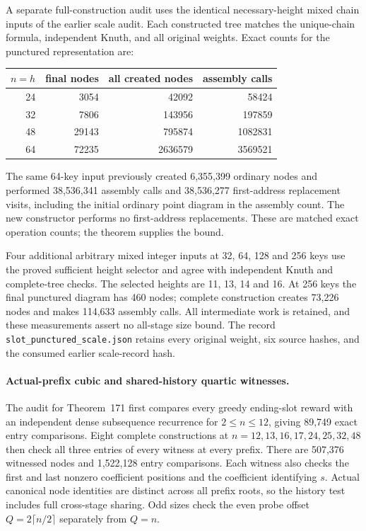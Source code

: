\documentclass[11pt]{article}
\begin{document}
A separate full-construction audit uses the identical necessary-height
mixed chain inputs of the earlier scale audit. Each constructed tree
matches the unique-chain formula, independent Knuth, and all original
weights. Exact counts for the punctured representation are:
\begin{center}
\begin{tabular}{r|r r r}
$n=h$ & final nodes & all created nodes & assembly calls\\
\hline
24 & 3054 & 42092 & 58424\\
32 & 7806 & 143956 & 197859\\
48 & 29143 & 795874 & 1082831\\
64 & 72235 & 2636579 & 3569521
\end{tabular}
\end{center}
The same 64-key input previously created 6,355,399 ordinary nodes and
performed 38,536,341 assembly calls and 38,536,277 first-address replacement
visits, including the initial ordinary point diagram in the assembly count. The new constructor performs no first-address replacements.
These are matched exact operation counts; the theorem supplies the bound.

Four additional arbitrary mixed integer inputs at 32, 64, 128 and 256 keys
use the proved sufficient height selector and agree with independent
Knuth and complete-tree checks. The selected heights are 11, 13, 14 and 16.
At 256 keys the final punctured diagram has 460 nodes; complete construction
creates 73,226 nodes and makes 114,633 assembly calls. All intermediate
work is retained, and these measurements assert no all-stage size bound.
The record \texttt{slot\_punctured\_scale.json} retains every original
weight, six source hashes, and the consumed earlier scale-record hash.

\paragraph{Actual-prefix cubic and shared-history quartic witnesses.}
The audit for Theorem~171 first compares every
greedy ending-slot reward with an independent dense subsequence recurrence
for $2\le n\le12$, giving 89,749 exact entry comparisons. Eight complete
constructions at $n=12,13,16,17,24,25,32,48$ then check all three entries
of every witness at every prefix. There are 507,376 witnessed nodes and
1,522,128 entry comparisons. Each witness also checks the first and last
nonzero coefficient positions and the coefficient identifying $s$.
Actual canonical node identities are distinct across all prefix roots,
so the history test includes full cross-stage sharing. Odd sizes check
the even probe offset $Q=2\lceil n/2\rceil$ separately from $Q=n$.
\end{document}
